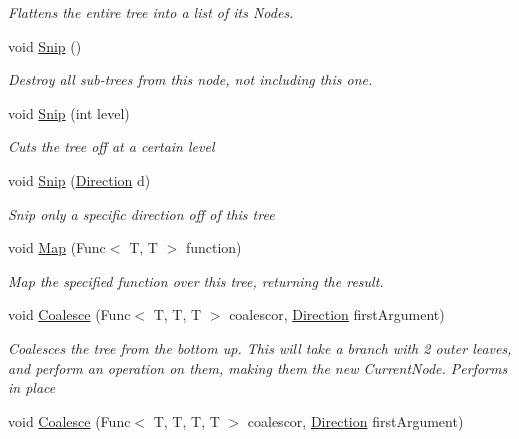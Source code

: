 \begin{DoxyCompactItemize}
\begin{DoxyCompactList}\small\item\em Flattens the entire tree into a list of its Nodes. \end{DoxyCompactList}\item 
void \hyperlink{classHumDrum_1_1Structures_1_1Tree_acc540c9328762ee60972eb201bac1345}{Snip} ()
\begin{DoxyCompactList}\small\item\em Destroy all sub-\/trees from this node, not including this one. \end{DoxyCompactList}\item 
void \hyperlink{classHumDrum_1_1Structures_1_1Tree_aed139022f0d4fe27c6436fcb886998cf}{Snip} (int level)
\begin{DoxyCompactList}\small\item\em Cuts the tree off at a certain level \end{DoxyCompactList}\item 
void \hyperlink{classHumDrum_1_1Structures_1_1Tree_a94660fb7c22e83a69fa393c5b471b23f}{Snip} (\hyperlink{namespaceHumDrum_1_1Structures_a83ca1f04475980cb7e79d471cc746dd3}{Direction} d)
\begin{DoxyCompactList}\small\item\em Snip only a specific direction off of this tree \end{DoxyCompactList}\item 
void \hyperlink{classHumDrum_1_1Structures_1_1Tree_a5d3243f43f874bf9b74df1421cce76ce}{Map} (Func$<$ T, T $>$ function)
\begin{DoxyCompactList}\small\item\em Map the specified function over this tree, returning the result. \end{DoxyCompactList}\item 
void \hyperlink{classHumDrum_1_1Structures_1_1Tree_a2a79e9ce92efb6da0c5ff185cd7a7d00}{Coalesce} (Func$<$ T, T, T $>$ coalescor, \hyperlink{namespaceHumDrum_1_1Structures_a83ca1f04475980cb7e79d471cc746dd3}{Direction} first\+Argument)
\begin{DoxyCompactList}\small\item\em Coalesces the tree from the bottom up. This will take a branch with 2 outer leaves, and perform an operation on them, making them the new Current\+Node. Performs in place \end{DoxyCompactList}\item 
void \hyperlink{classHumDrum_1_1Structures_1_1Tree_ad182989324502b2ea25dbaca8ed991e1}{Coalesce} (Func$<$ T, T, T, T $>$ coalescor, \hyperlink{namespaceHumDrum_1_1Structures_a83ca1f04475980cb7e79d471cc746dd3}{Direction} first\+Argument)

\end{DoxyCompactItemize}
